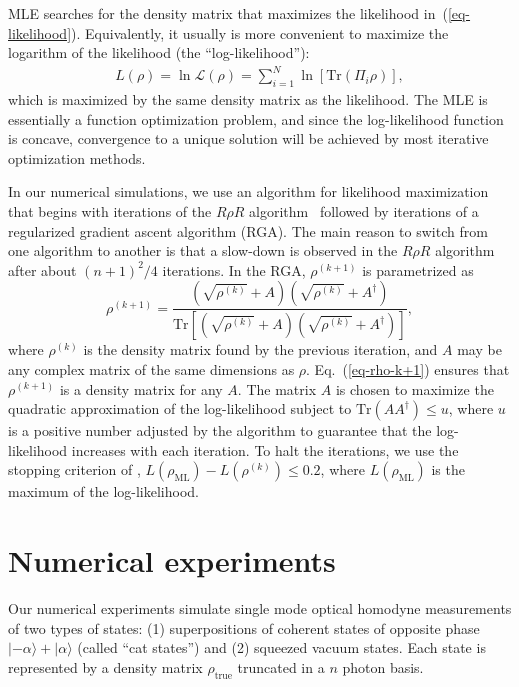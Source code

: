 \documentclass[
reprint,
superscriptaddress,
showpacs,
amsmath,
amssymb,
aps,
pra,
longbibliography
]{revtex4-1}
\begin{document}
MLE searches for the density matrix that maximizes the likelihood
in~(\ref{eq-likelihood}). Equivalently, it usually is more convenient
to maximize the logarithm of the likelihood (the ``log-likelihood''):
\begin{eqnarray}
  L (\rho) = \ln \mathcal{L} (\rho)= \sum_{i=1}^{N} \ln [\mathrm{Tr} (\Pi_i \rho)],
\end{eqnarray} 
which is maximized by the same density matrix as the likelihood. The
MLE is essentially a function optimization problem, and since the
log-likelihood function is concave, convergence to a unique solution 
will be achieved by most iterative optimization methods.

In our numerical simulations, we use an algorithm for likelihood
maximization that begins with iterations of the
$R\rho R$ algorithm~\cite{Rehacek2007} followed by iterations of a
regularized gradient ascent algorithm (RGA). The main reason to switch
from one algorithm to another is that a slow-down is observed in the 
$R\rho R$ algorithm after about $(n+1)^2/4$ iterations. In the RGA, 
$\rho^{(k+1)}$ is parametrized as
\begin{equation}
  \rho^{(k+1)}=\frac{\left(\sqrt{\rho^{(k)}}+A\right)\left(\sqrt{\rho^{(k)}}+A^{\dagger}\right)}{\mathrm{Tr}\left[\left(\sqrt{\rho^{(k)}}+A\right)\left(\sqrt{\rho^{(k)}}+A^{\dagger}\right)\right]},
  \label{eq-rho-k+1}
\end{equation}
where $\rho^{(k)}$ is the density matrix found by the previous iteration, and 
$A$ may be any complex matrix of the same dimensions as
$\rho$. Eq.~(\ref{eq-rho-k+1}) ensures that $\rho^{(k+1)}$ is a
density matrix for any $A$. The matrix $A$ is chosen to maximize the 
quadratic approximation of the log-likelihood subject to 
$\text{Tr}(AA^{\dagger})\leq u$, where $u$ is a positive number adjusted 
by the algorithm to guarantee that the log-likelihood increases with each 
iteration. To halt the iterations, we use the stopping criterion of \cite{Glancy2012},
$L(\rho_{\text{ML}})-L(\rho^{(k)})\leq 0.2$, where
$L(\rho_{\text{ML}})$ is the maximum of the log-likelihood.



\section{Numerical experiments}
\label{numerical-experiments}
Our numerical experiments simulate single mode optical homodyne
measurements of two types of states: (1) superpositions of coherent states of 
opposite phase $|-\alpha\rangle + |\alpha\rangle$ (called ``cat states'') and 
(2) squeezed vacuum states. Each state is represented by a density matrix 
$\rho_{\mathrm{true}}$ truncated in a $n$ photon basis.
\end{document}

